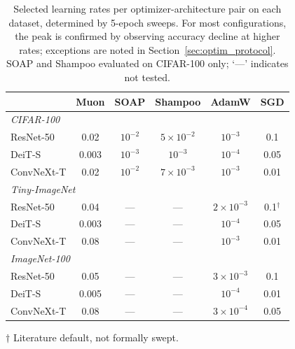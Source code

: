 \begin{table}[h]
\centering
\caption{Selected learning rates per optimizer-architecture pair on each dataset, determined by 5-epoch sweeps. For most configurations, the peak is confirmed by observing accuracy decline at higher rates; exceptions are noted in Section~\ref{sec:optim_protocol}. SOAP and Shampoo evaluated on CIFAR-100 only; `---' indicates not tested.}
\label{tab:lr_selected}
\small
\begin{tabular}{lccccc}
\toprule
& \textbf{Muon} & \textbf{SOAP} & \textbf{Shampoo} & \textbf{AdamW} & \textbf{SGD} \\
\midrule
\multicolumn{6}{l}{\textit{CIFAR-100}} \\
ResNet-50   & 0.02  & $10^{-2}$ & $5 \times 10^{-2}$ & $10^{-3}$ & 0.1  \\
DeiT-S      & 0.003 & $10^{-3}$          & $10^{-3}$          & $10^{-4}$ & 0.05 \\
ConvNeXt-T  & 0.02  & $10^{-2}$          & $7 \times 10^{-3}$ & $10^{-3}$ & 0.01 \\
\midrule
\multicolumn{6}{l}{\textit{Tiny-ImageNet}} \\
ResNet-50   & 0.04  & --- & --- & $2 \times 10^{-3}$ & 0.1$^\dagger$ \\
DeiT-S      & 0.003 & --- & --- & $10^{-4}$          & 0.05 \\
ConvNeXt-T  & 0.08  & --- & --- & $10^{-3}$          & 0.01 \\
\midrule
\multicolumn{6}{l}{\textit{ImageNet-100}} \\
ResNet-50   & 0.05  & --- & --- & $3 \times 10^{-3}$ & 0.1  \\
DeiT-S      & 0.005 & --- & --- & $10^{-4}$          & 0.01 \\
ConvNeXt-T  & 0.08  & --- & --- & $3 \times 10^{-4}$ & 0.05 \\
\bottomrule
\end{tabular}
\vspace{0.3em}
\par\noindent\footnotesize{$\dagger$ Literature default, not formally swept.}
\end{table}
